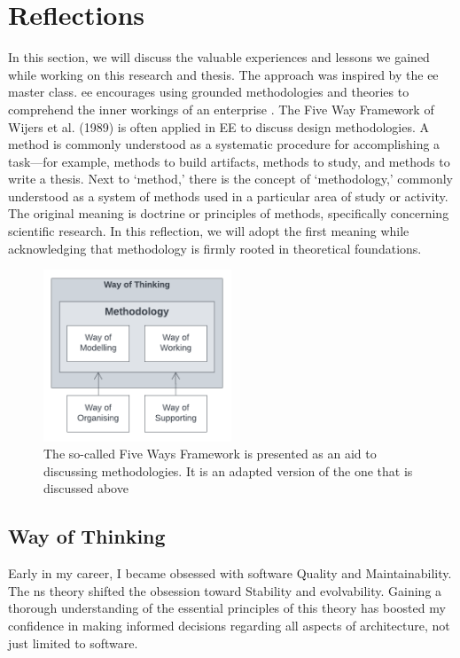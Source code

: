 \section{Reflections} \label{chap_reflection}

In this section, we will discuss the valuable experiences and lessons we gained while
working on this research and thesis. The approach was inspired by the \gls{ee} master
class. \gls{ee} encourages using grounded methodologies and theories to comprehend the
inner workings of an enterprise \parencite[262]{dietz_enterprise_2020}. The Five Way
Framework of Wijers et al. (1989) is often applied in EE to discuss design methodologies.
A method is commonly understood as a systematic procedure for accomplishing a task—for
example, methods to build artifacts, methods to study, and methods to write a thesis. Next
to \enquote*{method,} there is the concept of \enquote*{methodology,} commonly understood
as a system of methods used in a particular area of study or activity. The original
meaning is doctrine or principles of methods, specifically concerning scientific research.
In this reflection, we will adopt the first meaning while acknowledging that methodology
is firmly rooted in theoretical foundations.

\begin{figure}[H]
    \centering
    \includegraphics[width=0.5\textwidth]{figures/5ways.pdf}
    \caption[The Five Way Framework]{The so-called Five Ways Framework is presented as an aid to discussing methodologies. It is an adapted version of the one that is discussed above}
    \label{fig_5ways}
\end{figure}

\subsection{Way of Thinking}

Early in my career, I became obsessed with software Quality and Maintainability. The
\gls{ns} theory shifted the obsession toward Stability and evolvability. Gaining a
thorough understanding of the essential principles of this theory has boosted my
confidence in making informed decisions regarding all aspects of architecture, not just
limited to software.

